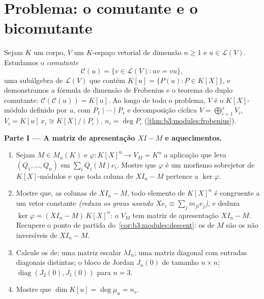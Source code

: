\section{Problema: o comutante e o bicomutante}

\begin{problem}\label{pb:b3:modules:1}
Sejam $K$ um corpo, $V$ um $K$-espaço vetorial de dimensão
$n \geq
1$ e $u \in \mathcal L(V)$. Estudamos o \emph{comutante}
\[
\mathcal C(u) = \{v \in \mathcal L(V) : uv = vu\},
\]
uma subálgebra de $\mathcal L(V)$ que contém $K[u] = \{P(u) : P \in
K[X]\}$, e demonstramos a fórmula de
dimensão de Frobenius e o teorema do duplo comutante: $\mathcal C(\mathcal C(u)) = K[u]$. Ao longo
de todo o problema, $V$ é o $K[X]$-módulo definido por $u$,
com  $P_1 \mid \cdots \mid P_s$ e decomposição cíclica $V =
\bigoplus_{i=1}^s V_i$, $V_i = K[u]\,x_i \cong K[X]/(P_i)$, $n_i
= \deg P_i$
(\cref{thm:b3:modules:frobenius}).

\medskip
\noindent\textbf{Parte I --- A matriz de apresentação $XI - M$ e
aquecimentos.}
\begin{enumerate}
  \item Sejam $M \in M_n(K)$ e $\varphi \colon K[X]^n \to V_M
        = K^n$ a aplicação que leva $(Q_1, \dots, Q_n)$ em $\sum_i Q_i(M)e_i$. Mostre
        que $\varphi$ é um morfismo sobrejetor de $K[X]$-módulos e que
        toda coluna de $XI_n - M$ pertence a $\ker\varphi$.
  \item Mostre que,  as colunas de $XI_n - M$, todo elemento de
        $K[X]^n$ é congruente a um vetor constante \emph{(reduza os
        graus usando $Xe_i \equiv \sum_j m_{ji}e_j$)}, e deduza $\ker\varphi = (XI_n - M)\,K[X]^n$: o  $V_M$ tem
        matriz de apresentação $XI_n - M$. Recupere o ponto de partida
        do~\cref{cor:b3:modules:descent}: os  de $M$ são
        os  não inversíveis de $XI_n - M$.
  \item Calcule os  de: uma matriz escalar
        $\lambda I_n$; uma matriz diagonal com entradas diagonais distintas; o
        bloco de Jordan $J_n(0)$ de tamanho $n \times n$; $\operatorname{diag}(J_2(0), J_1(0))$ para
        $n = 3$.
  \item Mostre que $\dim K[u] = \deg \mu_u = n_s$.
\end{enumerate}


\end{problem}
